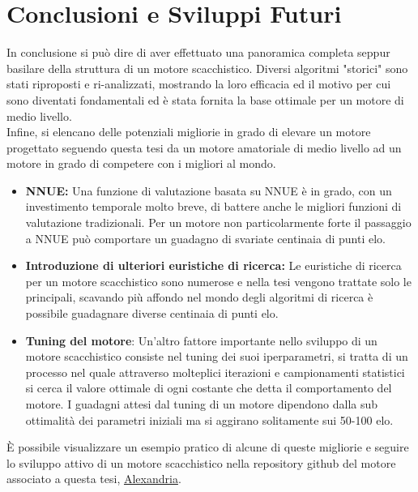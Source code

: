 \chapter{Conclusioni e Sviluppi Futuri} %
%


In conclusione si può dire di aver effettuato una panoramica completa seppur basilare della struttura di un motore scacchistico.
Diversi algoritmi "storici" sono stati riproposti e ri-analizzati, mostrando la loro efficacia ed il motivo per cui sono diventati fondamentali ed è stata fornita la base ottimale per un motore di medio livello.\\
Infine, si elencano delle potenziali migliorie in grado di elevare un motore progettato seguendo questa
tesi da un motore amatoriale di medio livello ad un motore in grado di competere con i migliori al mondo.
\begin{itemize}
    \item \textbf{NNUE:} Una funzione di valutazione basata su NNUE è in grado, con un investimento temporale 
    molto breve, di battere anche le migliori funzioni di valutazione tradizionali. Per un motore 
    non particolarmente forte il passaggio a NNUE può comportare un guadagno di svariate centinaia di 
    punti elo.
    \item \textbf{Introduzione di ulteriori euristiche di ricerca:} Le euristiche di ricerca per un motore
    scacchistico sono numerose e nella tesi vengono trattate solo le principali, scavando più affondo
    nel mondo degli algoritmi di ricerca è possibile guadagnare diverse centinaia di punti elo.
    \item \textbf{Tuning del motore}: Un'altro fattore importante 
    nello sviluppo di un motore scacchistico consiste nel tuning dei suoi iperparametri, si tratta di un processo nel quale attraverso 
    molteplici iterazioni e campionamenti statistici si cerca il valore ottimale di ogni costante che detta il comportamento del motore.
    I guadagni attesi dal tuning di un motore dipendono dalla sub ottimalità dei parametri iniziali ma si aggirano solitamente sui 50-100 elo.
\end{itemize}
È possibile visualizzare un esempio pratico di alcune di queste migliorie e seguire lo sviluppo attivo di 
un motore scacchistico nella repository github del motore associato a questa tesi,
{\href{https://github.com/PGG106/Alexandria}{Alexandria}}.